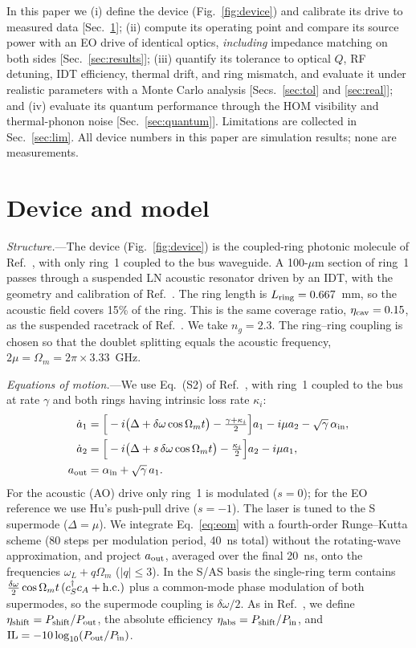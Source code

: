 \documentclass[aps,prapplied,reprint,superscriptaddress,amsmath,amssymb,floatfix]{revtex4-2}
\newcommand{\etash}{\eta_{\rm shift}}
\newcommand{\etaabs}{\eta_{\rm abs}}
\begin{document}
In this paper we (i) define the device (Fig.~\ref{fig:device}) and calibrate its drive to measured data [Sec.~\ref{sec:model}]; (ii) compute its operating point and compare its source power with an EO drive of identical optics, \emph{including} impedance matching on both sides [Sec.~\ref{sec:results}]; (iii) quantify its tolerance to optical $Q$, RF detuning, IDT efficiency, thermal drift, and ring mismatch, and evaluate it under realistic parameters with a Monte Carlo analysis [Secs.~\ref{sec:tol} and \ref{sec:real}]; and (iv) evaluate its quantum performance through the HOM visibility and thermal-phonon noise [Sec.~\ref{sec:quantum}]. Limitations are collected in Sec.~\ref{sec:lim}. All device numbers in this paper are simulation results; none are measurements.

\section{Device and model}\label{sec:model}
\emph{Structure.}---The device (Fig.~\ref{fig:device}) is the coupled-ring photonic molecule of Ref.~\cite{Hu2021}, with only ring~1 coupled to the bus waveguide. A 100-$\mu$m section of ring~1 passes through a suspended LN acoustic resonator driven by an IDT, with the geometry and calibration of Ref.~\cite{Shao2019}. The ring length is $L_{\rm ring}=0.667$~mm, so the acoustic field covers 15\% of the ring. This is the same coverage ratio, $\eta_{\rm cav}=0.15$, as the suspended racetrack of Ref.~\cite{Shao2019}. We take $n_g=2.3$. The ring--ring coupling is chosen so that the doublet splitting equals the acoustic frequency, $2\mu=\Omega_m=2\pi\times3.33$~GHz.

\emph{Equations of motion.}---We use Eq.~(S2) of Ref.~\cite{Hu2021}, with ring~1 coupled to the bus at rate $\gamma$ and both rings having intrinsic loss rate $\kappa_i$:
\begin{align}
\dot a_1&=\Big[-i\big(\Delta+\delta\omega\cos\Omega_m t\big)-\tfrac{\gamma+\kappa_i}{2}\Big]a_1-i\mu a_2-\sqrt{\gamma}\,\alpha_{\rm in},\nonumber\\
\dot a_2&=\Big[-i\big(\Delta+s\,\delta\omega\cos\Omega_m t\big)-\tfrac{\kappa_i}{2}\Big]a_2-i\mu a_1,\nonumber\\
a_{\rm out}&=\alpha_{\rm in}+\sqrt{\gamma}\,a_1 .
\label{eq:eom}
\end{align}
For the acoustic (AO) drive only ring~1 is modulated ($s=0$); for the EO reference we use Hu's push-pull drive ($s=-1$). The laser is tuned to the S supermode ($\Delta=\mu$). We integrate Eq.~\eqref{eq:eom} with a fourth-order Runge--Kutta scheme (80 steps per modulation period, 40~ns total) without the rotating-wave approximation, and project $a_{\rm out}$, averaged over the final 20~ns, onto the frequencies $\omega_L+q\Omega_m$ ($|q|\le3$). In the S/AS basis the single-ring term contains $\tfrac{\delta\omega}{2}\cos\Omega_m t\,(c_S^\dagger c_A+{\rm h.c.})$ plus a common-mode phase modulation of both supermodes, so the supermode coupling is $\delta\omega/2$. As in Ref.~\cite{Hu2021}, we define $\etash=P_{\rm shift}/P_{\rm out}$, the absolute efficiency $\etaabs=P_{\rm shift}/P_{\rm in}$, and ${\rm IL}=-10\log_{10}(P_{\rm out}/P_{\rm in})$.
\end{document}
